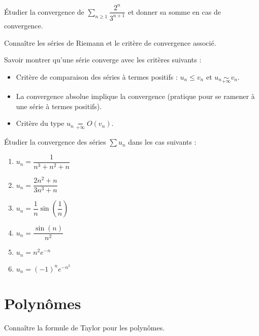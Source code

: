 \documentclass[a4paper,twoside,french,11pt]{VcCours}
\begin{document}
\begin{Exercice}{}
  Étudier la convergence de $\sum_{n \geq 1} \dfrac{2^n}{3^{n+1}}$ et donner sa somme en cas de convergence.
\end{Exercice} 

\begin{ptc}{}
	Connaître les séries de Riemann et le critère de convergence associé.
\end{ptc} 

\begin{ptc}{}
	Savoir montrer qu'une série converge avec les critères suivants : 
\begin{itemize}
\item Critère de comparaison des séries à termes positifs : $u_n \leq v_n$ et $u_n \underset{+ \infty}{\sim} v_n$.
\item La convergence absolue implique la convergence (pratique pour se ramener à une série à termes positifs).
\item Critère du type $u_n \underset{+ \infty}{=} O (v_n)$.
\end{itemize}
\end{ptc}

\begin{Exercice}{}
  Étudier la convergence des séries $\sum u_n$ dans les cas suivants :
  
  \begin{multicols}{3}
    \begin{enumerate}
      \item $u_n = \dfrac{1}{n^3+n^2+n}$
      \item $u_n = \dfrac{2n^2+n}{3n^3+n}$
      \columnbreak
      \item $u_n = \dfrac{1}{n} \sin \left( \dfrac{1}{n} \right)$
      \item $u_n = \dfrac{\sin(n)}{n^2} $
      \columnbreak
      \item $u_n = n^2 e^{-n}$
      \item $u_n = (-1)^n e^{-n^2}$
    \end{enumerate}
  \end{multicols}
\end{Exercice} 

\section{Polynômes}

\begin{ptc}{}
	Connaître la formule de Taylor pour les polynômes.
\end{ptc}
\end{document}
